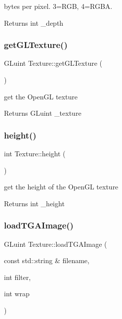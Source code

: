 bytes per pixel. 3=R\+GB, 4=R\+G\+BA. 

\begin{DoxyReturn}{Returns}
int \+\_\+depth 
\end{DoxyReturn}
\mbox{\label{class_texture_a0c27269ad25e0d90b7bab79deaf39769}} 
\subsubsection{\texorpdfstring{get\+G\+L\+Texture()}{getGLTexture()}}
{\footnotesize\ttfamily G\+Luint Texture\+::get\+G\+L\+Texture (\begin{DoxyParamCaption}{ }\end{DoxyParamCaption})\hspace{0.3cm}{\ttfamily [inline]}}



get the Open\+GL texture 

\begin{DoxyReturn}{Returns}
G\+Luint \+\_\+texture 
\end{DoxyReturn}
\mbox{\label{class_texture_a313a22ab82d389b2cb36fdb5cff40ecd}} 
\subsubsection{\texorpdfstring{height()}{height()}}
{\footnotesize\ttfamily int Texture\+::height (\begin{DoxyParamCaption}{ }\end{DoxyParamCaption})\hspace{0.3cm}{\ttfamily [inline]}}



get the height of the Open\+GL texture 

\begin{DoxyReturn}{Returns}
int \+\_\+height 
\end{DoxyReturn}
\mbox{\label{class_texture_a55975532738a6fab41ef8ad793d6a0ad}} 
\subsubsection{\texorpdfstring{load\+T\+G\+A\+Image()}{loadTGAImage()}}
{\footnotesize\ttfamily G\+Luint Texture\+::load\+T\+G\+A\+Image (\begin{DoxyParamCaption}\item[{const std\+::string \&}]{filename,  }\item[{int}]{filter,  }\item[{int}]{wrap }\end{DoxyParamCaption})}



